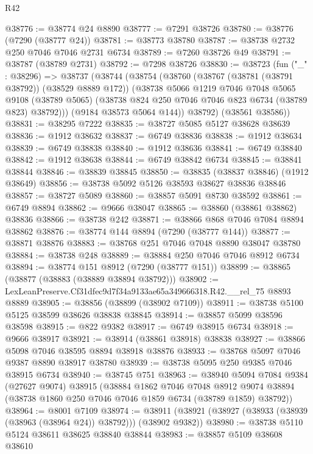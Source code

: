 \begin{lexlean}{R42}
\begin{coremodule}
{@38776 := @38774 @24 @8890
@38777 := @7291 @38726
@38780 := @38776 (@7290 (@38777 @24))
@38781 := @38773 @38780
@38787 := @38738 @2732 @250 @7046 @7046 @2731 @6734
@38789 := @7260 @38726 @49
@38791 := @38787 (@38789 @2731)
@38792 := @7298 @38726
@38830 := @38723
    (fun ("_" : @38296) =>
    @38737
      (@38744
        (@38754
          (@38760
            (@38767 (@38781 (@38791 @38792)) (@38529 @8889 @172))
            (@38738
              @5066
              @1219
              @7046
              @7048
              @5065
              @9108
              (@38789 @5065)
              (@38738 @824 @250 @7046 @7046 @823 @6734 (@38789 @823) @38792)))
          (@9184 @38573 @5064 @144))
        @38792)
      (@38561 @38586))
@38831 := @38295 @7222
@38835 := @38727 @5085 @5127 @38628 @38639
@38836 := @1912 @38632
@38837 := @6749 @38836
@38838 := @1912 @38634
@38839 := @6749 @38838
@38840 := @1912 @38636
@38841 := @6749 @38840
@38842 := @1912 @38638
@38844 := @6749 @38842 @6734
@38845 := @38841 @38844
@38846 := @38839 @38845
@38850 := @38835 (@38837 @38846) (@1912 @38649)
@38856 := @38738 @5092 @5126 @38593 @38627 @38836 @38846
@38857 := @38727 @5089
@38860 := @38857 @5091 @8730 @38592
@38861 := @6749 @8894
@38862 := @9666 @38047
@38865 := @38860 (@38861 @38862) @38836
@38866 := @38738 @242
@38871 := @38866 @868 @7046 @7084 @8894 @38862
@38876 := @38774 @144 @8894 (@7290 (@38777 @144))
@38877 := @38871 @38876
@38883 := @38768 @251 @7046 @7048 @8890 @38047 @38780
@38884 := @38738 @248
@38889 := @38884 @250 @7046 @7046 @8912 @6734
@38894 := @38774 @151 @8912 (@7290 (@38777 @151))
@38899 := @38865 (@38877 (@38883 (@38889 @38894 @38792)))
@38902 := LexLeanPreserve.Cf31dfec9d7f34a9133ae65a349666318.R42.__rel_75 @8893 @8889
@38905 := @38856 (@38899 (@38902 @7109))
@38911 := @38738 @5100 @5125 @38599 @38626 @38838 @38845
@38914 := @38857 @5099 @38596 @38598
@38915 := @822 @9382
@38917 := @6749 @38915 @6734
@38918 := @9666 @38917
@38921 := @38914 (@38861 @38918) @38838
@38927 := @38866 @5098 @7046 @38595 @8894 @38918 @38876
@38933 := @38768 @5097 @7046 @9387 @8890 @38917 @38780
@38939 := @38738 @5095 @250 @9385 @7046 @38915 @6734
@38940 := @38745 @751
@38963 := @38940
    @5094
    @7084
    @9384
    (@27627 @9074)
    @38915
    (@38884
      @1862
      @7046
      @7048
      @8912
      @9074
      @38894
      (@38738 @1860 @250 @7046 @7046 @1859 @6734 (@38789 @1859) @38792))
@38964 := @8001 @7109
@38974 := @38911 (@38921 (@38927 (@38933 (@38939 (@38963 (@38964 @24)) @38792))) (@38902 @9382))
@38980 := @38738 @5110 @5124 @38611 @38625 @38840 @38844
@38983 := @38857 @5109 @38608 @38610
}
\end{coremodule}
\end{lexlean}
